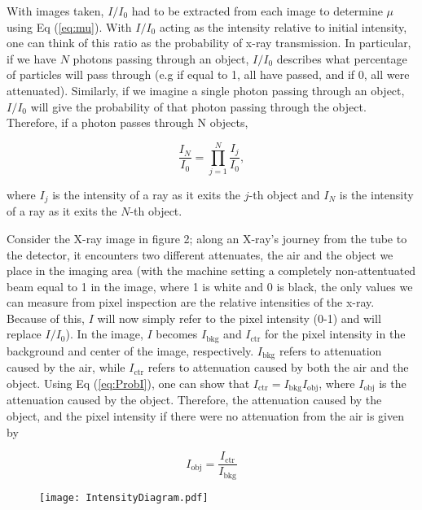 With images taken, $I/I_0$ had to be extracted from each image to determine $\mu$ using Eq (\ref{eq:mu}). With $I/I_0$ acting as the intensity relative to initial intensity, one can think of this ratio as the probability of x-ray transmission. In particular, if we have $N$ photons passing through an object, $I/I_0$ describes what percentage of particles will pass through (e.g if equal to 1, all have passed, and if 0, all were attenuated). Similarly, if we imagine a single photon passing through an object, $I/I_0$ will give the probability of that photon passing through the object. Therefore, if a photon passes through N objects, 

\begin{equation}
    \frac{I_N}{I_0} = \prod_{j=1}^{N} \frac{I_j}{I_0},
   \label{eq:ProbI}
\end{equation}

where $I_j$ is the intensity of a ray as it exits the $j$-th object and $I_N$ is the intensity of a ray as it exits the $N$-th object.

Consider the X-ray image in figure 2; along an X-ray's journey from the tube to the detector, it encounters two different attenuates, the air and the object we place in the imaging area (with the machine setting a completely non-attentuated beam equal to 1 in the image, where 1 is white and 0 is black, the only values we can measure from pixel inspection are the relative intensities of the x-ray. Because of this, $I$ will now simply refer to the pixel intensity (0-1) and will replace $I/I_0$). In the image, $I$ becomes $I_{\text{bkg}}$ and $I_{\text{ctr}}$ for the pixel intensity in the background and center of the image, respectively. $I_{\text{bkg}}$ refers to attenuation caused by the air, while $I_{\text{ctr}}$ refers to attenuation caused by both the air and the object. Using Eq (\ref{eq:ProbI}), one can show that $I_{\text{ctr}} = I_{\text{bkg}} I_{\text{obj}}$, where $I_{\text{obj}}$ is the attenuation caused by the object. Therefore, the attenuation caused by the object, and the pixel intensity if there were no attenuation from the air is given by

\begin{equation}
    I_{\text{obj}} = \frac{I_{\text{ctr}}}{I_{\text{bkg}}}
\label{eq:IObj}
\end{equation}

\begin{figure}[H]
    \centering
	\texttt{[image: IntensityDiagram.pdf]}
	\label{figure:IntensityDiagram}
	\caption{}
\end{figure}